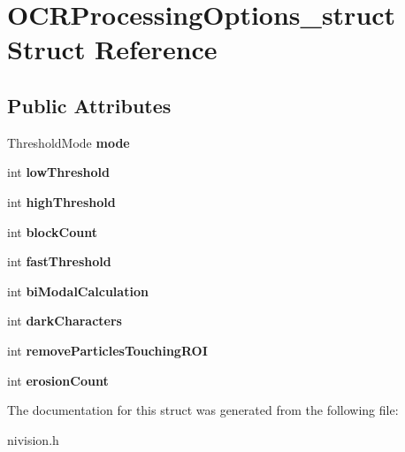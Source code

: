 \hypertarget{structOCRProcessingOptions__struct}{
\section{OCRProcessingOptions\_\-struct Struct Reference}
\label{structOCRProcessingOptions__struct}
}
\subsection*{Public Attributes}
\begin{DoxyCompactItemize}
\item 
\hypertarget{structOCRProcessingOptions__struct_a481cb99e45610ff4b87864db08a89af2}{
ThresholdMode {\bfseries mode}}
\label{structOCRProcessingOptions__struct_a481cb99e45610ff4b87864db08a89af2}

\item 
\hypertarget{structOCRProcessingOptions__struct_aa1f5c73c9510060aff2b8787642d21f0}{
int {\bfseries lowThreshold}}
\label{structOCRProcessingOptions__struct_aa1f5c73c9510060aff2b8787642d21f0}

\item 
\hypertarget{structOCRProcessingOptions__struct_a13c778893b4c224bf84fe5b9c86dbca8}{
int {\bfseries highThreshold}}
\label{structOCRProcessingOptions__struct_a13c778893b4c224bf84fe5b9c86dbca8}

\item 
\hypertarget{structOCRProcessingOptions__struct_a0a1947d104fbc507b18a7ae28a81b13f}{
int {\bfseries blockCount}}
\label{structOCRProcessingOptions__struct_a0a1947d104fbc507b18a7ae28a81b13f}

\item 
\hypertarget{structOCRProcessingOptions__struct_a6f8d4a011352194b8a204a79213dea4e}{
int {\bfseries fastThreshold}}
\label{structOCRProcessingOptions__struct_a6f8d4a011352194b8a204a79213dea4e}

\item 
\hypertarget{structOCRProcessingOptions__struct_a32a9873e5013d4d02a7081c19bf1f7d4}{
int {\bfseries biModalCalculation}}
\label{structOCRProcessingOptions__struct_a32a9873e5013d4d02a7081c19bf1f7d4}

\item 
\hypertarget{structOCRProcessingOptions__struct_add7ba8dc8bbded4deca7bef3f4a9da3e}{
int {\bfseries darkCharacters}}
\label{structOCRProcessingOptions__struct_add7ba8dc8bbded4deca7bef3f4a9da3e}

\item 
\hypertarget{structOCRProcessingOptions__struct_ad069d91f2b641667c3dcc70db64735a3}{
int {\bfseries removeParticlesTouchingROI}}
\label{structOCRProcessingOptions__struct_ad069d91f2b641667c3dcc70db64735a3}

\item 
\hypertarget{structOCRProcessingOptions__struct_a80f9275b34fa855a4aa752458f27542d}{
int {\bfseries erosionCount}}
\label{structOCRProcessingOptions__struct_a80f9275b34fa855a4aa752458f27542d}

\end{DoxyCompactItemize}


The documentation for this struct was generated from the following file:\begin{DoxyCompactItemize}
\item 
nivision.h\end{DoxyCompactItemize}
